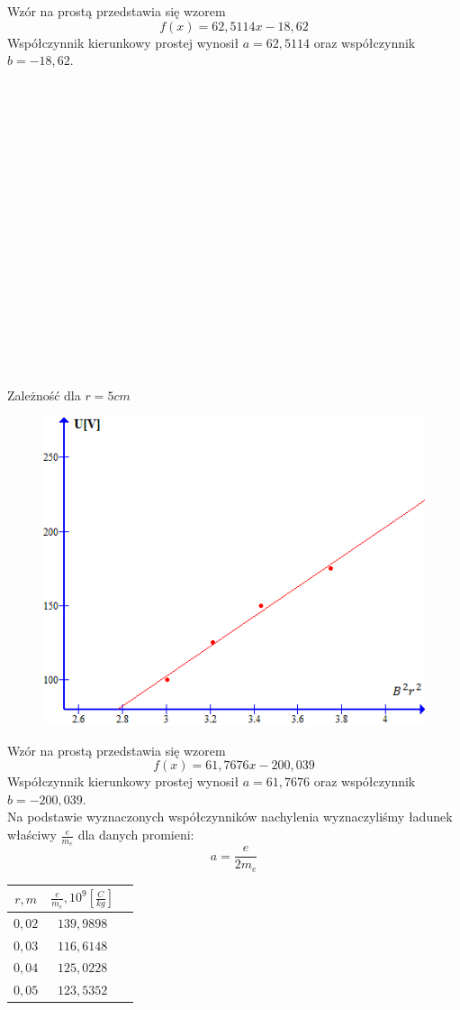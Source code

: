 \documentclass{article}
\begin{document}
Wzór na prostą przedstawia się wzorem
$$ f(x) = 62,5114x - 18,62$$
Współczynnik kierunkowy prostej wynosił $a = 62,5114$ oraz współczynnik $b = -18,62$.\\\\\\\\\\\\\\\\\\\\\\\\\\\\\\\\\\\\\\
Zależność dla $r = 5cm$
\begin{figure}[H]
\centering
\includegraphics[width=15cm]{wykres4.png}
\end{figure}
Wzór na prostą przedstawia się wzorem
$$ f(x) = 61,7676x - 200,039$$
Współczynnik kierunkowy prostej wynosił $a = 61,7676$ oraz współczynnik $b = -200,039$.\\
Na podstawie wyznaczonych współczynników nachylenia wyznaczyliśmy ładunek właściwy $\frac{e}{m_e}$ dla danych promieni:
$$a = \frac{e}{2m_e}$$
\begin{center}
\begin{tabular}{|c|c|c|}
\hline
$r, m$ & $\frac{e}{m_e}, 10^9 [\frac{C}{kg}]$  \\ \hline 
$0,02$ & $139,9898$  \\ \hline 
$0,03$ & $116,6148$  \\ \hline 
$0,04$ & $125,0228$  \\ \hline 
$0,05$ & $123,5352$  \\ \hline 
\end{tabular}
\end{center}
\end{document}
